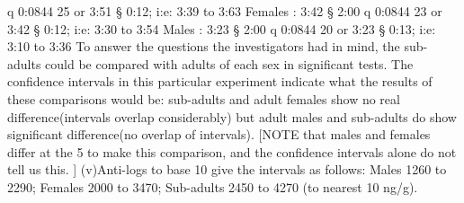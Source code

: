 q
0:0844
25 or 3:51 § 0:12; i:e: 3:39 to 3:63
Females : 3:42 § 2:00
q
0:0844
23 or 3:42 § 0:12; i:e: 3:30 to 3:54
Males : 3:23 § 2:00
q
0:0844
20 or 3:23 § 0:13; i:e: 3:10 to 3:36
To answer the questions the investigators had in mind, the sub-adults could be compared
with adults of each sex in significant tests. The confidence intervals in this particular experiment
indicate what the results of these comparisons would be: sub-adults and adult females show no
real difference(intervals overlap considerably) but adult males and sub-adults do show significant
difference(no overlap of intervals).
[NOTE that males and females differ at the 5%
to make this comparison, and the confidence intervals alone do not tell us this. ]
(v)Anti-logs to base 10 give the intervals as follows:
Males 1260 to 2290; Females 2000 to 3470;
Sub-adults 2450 to 4270 (to nearest 10 ng/g).
